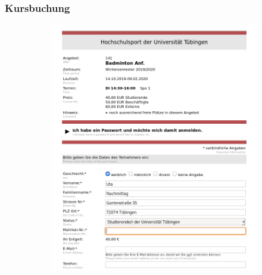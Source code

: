 \documentclass{beamer}
\begin{document}
	\begin{frame}
	\frametitle{Kursbuchung}
	\begin{figure}
		\begin{subfigure}{0.32\textwidth}
			\includegraphics[width=\textwidth]{figures/screenshot_bookingseite.png}
		\end{subfigure}
		\begin{subfigure}{0.32\textwidth}

\end{subfigure}
\end{figure}
\end{frame}
\end{document}

